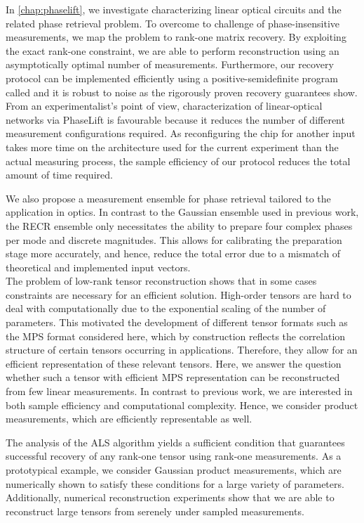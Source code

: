 In \cref{chap:phaselift}, we investigate characterizing linear optical circuits and the related phase retrieval problem.
To overcome to challenge of phase-insensitive measurements, we map the problem to rank-one matrix recovery.
By exploiting the exact rank-one constraint, we are able to perform reconstruction using an asymptotically optimal number of measurements.
Furthermore, our recovery protocol can be implemented efficiently using a positive-semidefinite program called  and it is robust to noise as the rigorously proven recovery guarantees show.
From an experimentalist's point of view, characterization of linear-optical networks via PhaseLift is favourable because it reduces the number of different measurement configurations required.
As reconfiguring the chip for another input takes more time on the architecture used for the current experiment than the actual measuring process, the sample efficiency of our protocol reduces the total amount of time required.

We also propose a measurement ensemble for phase retrieval tailored to the application in optics.
In contrast to the Gaussian ensemble used in previous work, the RECR ensemble only necessitates the ability to prepare four complex phases per mode and discrete magnitudes.
This allows for calibrating the preparation stage more accurately, and hence, reduce the total error due to a mismatch of theoretical and implemented input vectors.\\


The problem of low-rank tensor reconstruction shows that in some cases constraints are necessary for an efficient solution.
High-order tensors are hard to deal with computationally due to the exponential scaling of the number of parameters.
This motivated the development of different tensor formats such as the MPS format considered here, which by construction reflects the correlation structure of certain tensors occurring in applications.
Therefore, they allow for an efficient representation of these relevant tensors.
Here, we answer the question whether such a tensor with efficient MPS representation can be reconstructed from few linear measurements.
In contrast to previous work, we are interested in both sample efficiency and computational complexity.
Hence, we consider product measurements, which are efficiently representable as well.

The analysis of the ALS algorithm yields a sufficient condition that guarantees successful recovery of any rank-one tensor using rank-one measurements.
As a prototypical example, we consider Gaussian product measurements, which are numerically shown to satisfy these conditions for a large variety of parameters.
Additionally, numerical reconstruction experiments show that we are able to reconstruct large tensors from serenely under sampled measurements.


